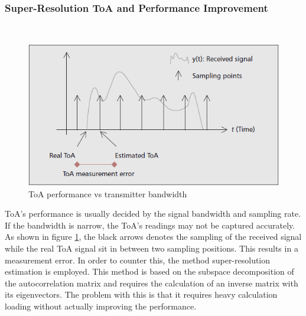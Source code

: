 \documentclass{l4proj}
\begin{document}
\subsubsection{Super-Resolution ToA and Performance Improvement}~\\
\FloatBarrier
\begin{figure}[h]
    \centering
    \includegraphics[width=120mm]{images/toa}
    \caption{ToA performance vs transmitter bandwidth}
    \label{fig:toa1}
\end{figure}
ToA's performance is usually decided by the signal bandwidth and sampling rate. If the bandwidth is narrow, the ToA's readings may not be captured accurately. As shown in figure \ref{fig:toa1}, the black arrows denotes the sampling of the received signal while the real ToA signal sit in between two sampling positions. This results in a measurement error. In order to counter this, the method super-resolution estimation is employed. This method is based on the subspace decomposition of the autocorrelation matrix and requires the calculation of an inverse matrix with its eigenvectors. The problem with this is that it requires heavy calculation loading without actually improving the performance.\cite{superreso}\\
\end{document}
